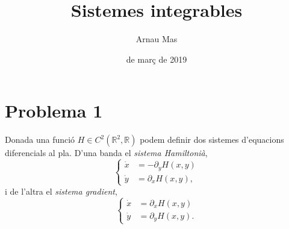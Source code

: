 \documentclass[12pt]{report}
\title{\sffamily {\bfseries Seminari 1:} {\sffamily Sistemes integrables}}
\author{\sffamily Arnau Mas}
\date{\sffamily 25 de març de 2019}
\numberwithin{table}{section}
\numberwithin{equation}{section}
\numberwithin{figure}{section}
\newcommand{\R}{\mathbb{R}}
\begin{document}
\maketitle

\section*{Problema 1}
Donada una funció \( H \in C^2(\R^2, \R) \) podem definir dos sistemes d'equacions diferencials al pla. D'una banda el \emph{sistema Hamiltonià},
\begin{equation*}
	\left\{ 
		\begin{aligned}
			\dot{x} & = -\partial_y H(x,y) \\
			\dot{y} & = \partial_x H(x,y),
		\end{aligned} 
	\right. 
\end{equation*}
i de l'altra el \emph{sistema gradient}, 
\begin{equation*}
	\left\{ 
		\begin{aligned}
			\dot{x} & = \partial_x H(x,y) \\
			\dot{y} & = \partial_y H(x,y).
		\end{aligned} 
	\right. 
\end{equation*}
\end{document}
